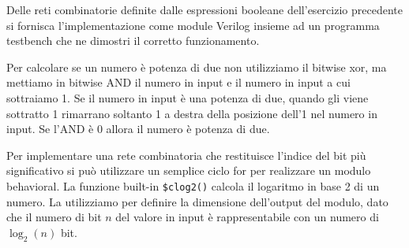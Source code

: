 \begin{exrc}
	Delle reti combinatorie definite dalle espressioni booleane dell’esercizio
	precedente si fornisca l’implementazione come module Verilog insieme ad un
	programma testbench che ne dimostri il corretto funzionamento.
	
	Per calcolare se un numero è potenza di due non utilizziamo il bitwise xor,
	ma mettiamo in bitwise AND il numero in input e il numero in input a cui
	sottraiamo 1. Se il numero in input è una potenza di due, quando gli viene
	sottratto 1 rimarrano soltanto 1 a destra della posizione dell'1 nel numero
	in input. Se l'AND è 0 allora il numero è potenza di due.

	
	
	
	Per implementare una rete combinatoria che restituisce l'indice del bit più
	significativo si può utilizzare un semplice ciclo for per realizzare un
	modulo behavioral. La funzione built-in \texttt{\$clog2()} calcola il
	logaritmo in base 2 di un numero. La utilizziamo per definire la dimensione
	dell'output del modulo, dato che il numero di bit $ n $ del valore in input
	è rappresentabile con un numero di $ \log_2(n) $ bit.
	
	
	
	
\end{exrc}

